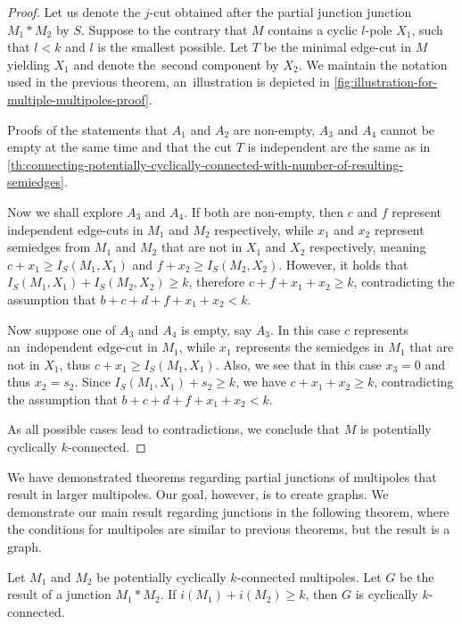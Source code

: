\documentclass[12pt, twoside]{book}
\begin{document}
\begin{proof}
	Let us denote the $j$-cut obtained after the partial junction junction $M_1*M_2$ by $S$. Suppose to the contrary that $M$ contains a cyclic $l$-pole $X_1$, such that $l<k$ and $l$ is the smallest possible. Let $T$ be the minimal edge-cut in $M$ yielding $X_1$ and denote the~second component by $X_2$. We maintain the notation used in the previous theorem, an~illustration is depicted in \cref{fig:illustration-for-multiple-multipoles-proof}.
	
	Proofs of the statements that $A_1$ and $A_2$ are non-empty, $A_3$ and $A_4$ cannot be empty at the same time and that the cut $T$ is independent are the same as in \cref{th:connecting-potentially-cyclically-connected-with-number-of-resulting-semiedges}.
	
	Now we shall explore $A_3$ and $A_4$. If both are non-empty, then $c$ and $f$ represent independent edge-cuts in $M_1$ and $M_2$ respectively, while $x_1$ and $x_2$ represent semiedges from $M_1$ and $M_2$ that are not in $X_1$ and $X_2$ respectively, meaning ${c+x_1\geq I_S(M_1, X_1)}$ and ${f+x_2\geq I_S(M_2, X_2)}$. However, it holds that ${I_S(M_1, X_1)+I_S(M_2, X_2)\geq k}$, therefore $c+f+x_1+x_2\geq k$, contradicting the assumption that ${b+c+d+f+x_1+x_2<k}$.
	
	Now suppose one of $A_3$ and $A_4$ is empty, say $A_3$. In this case $c$ represents an~independent edge-cut in $M_1$, while $x_1$ represents the semiedges in $M_1$ that are not in $X_1$, thus ${c+x_1\geq I_S(M_1, X_1)}$. Also, we see that in this case $x_3=0$ and thus $x_2=s_2$. Since ${I_S(M_1, X_1)+s_2\geq k}$, we have $c+x_1+x_2\geq k$, contradicting the assumption that ${b+c+d+f+x_1+x_2<k}$.
	
	As all possible cases lead to contradictions, we conclude that $M$ is potentially cyclically \mbox{$k$-connected}.
\end{proof}

We have demonstrated theorems regarding partial junctions of multipoles that result in larger multipoles. Our goal, however, is to create graphs. We demonstrate our main result regarding junctions in the following theorem, where the conditions for multipoles are similar to previous theorems, but the result is a graph.

\begin{theorem}\label{th:cyclic-edge-connectivity-of-potentially-with-independent-cuts}
	Let $M_1$ and $M_2$ be potentially cyclically $k$-connected multipoles. Let $G$ be the result of a junction $M_1*M_2$. If $i(M_1)+i(M_2)\geq k$, then $G$ is cyclically $k$-connected.
\end{theorem}
\end{document}
